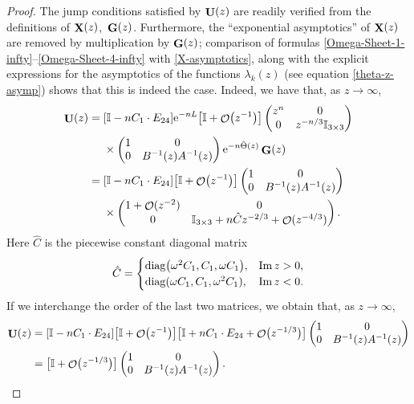 \documentclass[pdftex]{sigma}
\DeclareMathOperator{\OO}{\mathcal{O}}
\DeclareMathOperator{\XX}{{\bf X}}
\DeclareMathOperator{\UU}{{\bf U}}
\DeclareMathOperator{\GG}{{\bf G}}
\numberwithin{equation}{section}
\begin{document}
\begin{proof}
The jump conditions satisfied by $\UU(z)$ are readily verified from the definitions of $\XX(z)$,~$\GG(z)$. Furthermore, the ``exponential asymptotics'' of $\XX(z)$
are removed by multiplication by $\GG(z)$;
comparison of formulas \eqref{Omega-Sheet-1-infty}--\eqref{Omega-Sheet-4-infty} with \eqref{X-asymptotics}, along with the explicit expressions for the asymptotics of the functions $\lambda_k(z)$ (see equation \eqref{theta-z-asymp}) shows that this is indeed the case. Indeed, we have that, as $z\to \infty$,
 \begin{align*}
 \UU(z)={}& [\mathbb{I} -nC_1 \cdot E_{24}] {\rm e}^{-n L}\bigl[\mathbb{I} + \OO\bigl(z^{-1}\bigr)\bigr]\begin{pmatrix}
 z^{n} & 0\\
 0 & z^{-n/3}\mathbb{I}_{3\times 3}
 \end{pmatrix}\\
 &\times
 \begin{pmatrix}
 1 & 0\\
 0 & B^{-1}(z) A^{-1}(z)
 \end{pmatrix}{\rm e}^{-n\hat{\Theta}(z)} \GG(z)\\
={}&[\mathbb{I} -n C_1 \cdot E_{24}]\bigl[\mathbb{I} + \OO\bigl(z^{-1}\bigr)\bigr]
 \begin{pmatrix}
 1 & 0\\
 0 & B^{-1}(z) A^{-1}(z)
 \end{pmatrix}\\
 &\times
 \begin{pmatrix}
 1 + \OO(z^{-2}) & 0 \\
 0 & \mathbb{I}_{3\times 3} + n\hat{C}z^{-2/3} + \OO(z^{-4/3})
 \end{pmatrix}.
 \end{align*}
Here $\hat{C}$ is the piecewise constant diagonal matrix
 \begin{equation*}
 \hat{C} =
 \begin{cases}
 {\rm diag}\bigl(\omega^2 C_1, C_1,\omega C_1\bigr), & \operatorname{Im} z > 0,\\
 {\rm diag}(\omega C_1, C_1,\omega^2 C_1), & \operatorname{Im} z < 0.
 \end{cases}
 \end{equation*}
If we interchange the order of the last two matrices, we obtain that, as $z\to \infty$,
 \begin{align*}
 \UU(z) &= [\mathbb{I} -n C_1\cdot E_{24}] \bigl[\mathbb{I} + \OO\bigl(z^{-1}\bigr)\bigr] \bigl[\mathbb{I} + n C_1 \cdot E_{24} + \OO\bigl(z^{-1/3}\bigr)\bigr]
 \begin{pmatrix}
 1 & 0\\
 0 & B^{-1}(z) A^{-1}(z)
 \end{pmatrix}\\
 &= \bigl[\mathbb{I} + \OO\bigl(z^{-1/3}\bigr) \bigr]
 \begin{pmatrix}
 1 & 0\\
 0 & B^{-1}(z) A^{-1}(z)
 \end{pmatrix}.
 \end{align*}


\end{proof}
\end{document}
